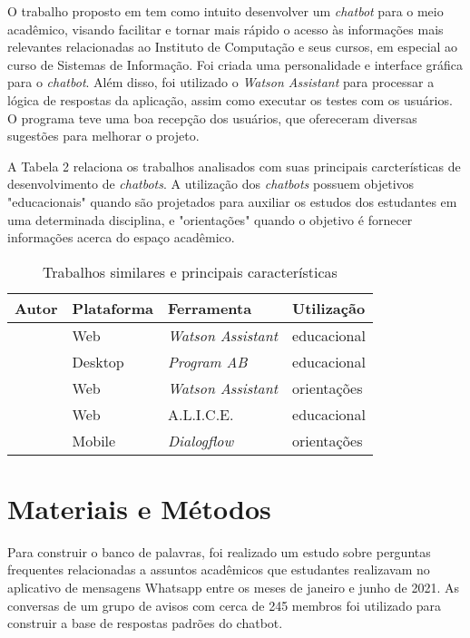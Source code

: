 \documentclass[12pt]{article}
\begin{document}
O trabalho proposto em \cite{catbot:19} tem como intuito desenvolver um {\itshape chatbot} para o meio acadêmico, visando facilitar e tornar mais rápido o acesso às informações mais relevantes relacionadas ao Instituto de Computação e seus cursos, em especial ao curso de Sistemas de Informação. Foi criada uma personalidade e interface gráfica para o {\itshape chatbot}. Além disso, foi utilizado o {\itshape Watson Assistant} para processar a lógica de respostas da aplicação, assim como executar os testes com os usuários. O programa teve uma boa recepção dos usuários, que ofereceram diversas sugestões para melhorar o projeto.

A Tabela 2 relaciona os trabalhos analisados com suas principais carcterísticas de desenvolvimento de {\itshape chatbots}. A utilização dos {\itshape chatbots} possuem objetivos "educacionais" quando são projetados para auxiliar os estudos dos estudantes em uma determinada disciplina, e "orientações" quando o objetivo é fornecer informações acerca do espaço acadêmico.

\begin{table}[h!]
\caption{Trabalhos similares e principais características}
\label{table:1}
\begin{tabular}{ |p{3cm}||p{3cm}|p{3cm}|p{3cm}|  }
 \hline
Autor & Plataforma & Ferramenta & Utilização\\
 \hline
 \cite{araujo:20}   & Web    & {\itshape Watson Assistant} &   educacional\\
 \cite{bulhoes:20}&   Desktop  & {\itshape Program AB}   & educacional\\
 \cite{catbot:19} & Web & {\itshape Watson Assistant} &  orientações\\
 \cite{lucchesi:18}    & Web & A.L.I.C.E. & educacional\\
 \cite{maciel:19}  & Mobile  & {\itshape Dialogflow} & orientações\\
 \hline
\end{tabular}
\end{table}

\section{Materiais e Métodos} \label{sec:firstpage}

Para construir o banco de palavras, foi realizado um estudo sobre perguntas frequentes relacionadas a assuntos acadêmicos que estudantes realizavam no aplicativo de mensagens Whatsapp entre os meses de janeiro e junho de 2021. As conversas de um grupo de avisos com cerca de 245 membros foi utilizado para construir a base de respostas padrões do chatbot.







\end{document}
